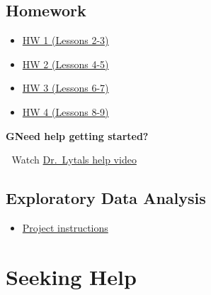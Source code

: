 \documentclass[
  letterpaper,
  DIV=11,
  numbers=noendperiod,
  oneside]{scrreprt}
\providecommand{\tightlist}{%
  \setlength{\itemsep}{0pt}\setlength{\parskip}{0pt}}\usepackage{longtable,booktabs,array}
\begin{document}
\section*{Homework}\label{homework}


\begin{itemize}
\tightlist
\item
  \href{hw/hw1.qmd}{HW 1 (Lessons 2-3)}
\item
  \href{hw/hw2.qmd}{HW 2 (Lessons 4-5)}
\item
  \href{hw/hw3.qmd}{HW 3 (Lessons 6-7)}
\item
  \href{hw/hw4.qmd}{HW 4 (Lessons 8-9)}
\end{itemize}

\begin{tcolorbox}[enhanced jigsaw, rightrule=.15mm, arc=.35mm, bottomrule=.15mm, leftrule=.75mm, breakable, colframe=quarto-callout-warning-color-frame, left=2mm, toprule=.15mm, opacityback=0, colback=white]

\vspace{-3mm}\textbf{GNeed help getting started?}\vspace{3mm}

🚧 Watch
\href{https://media.csuchico.edu/media/MATH130\%20-\%20Extra\%20Video\%20(Jan\%2029)/1_9nsoxdy9}{Dr.~Lytals
help video}

\end{tcolorbox}

\section*{Exploratory Data Analysis}\label{exploratory-data-analysis}


\begin{itemize}
\tightlist
\item
  \href{project.qmd}{Project instructions}
\end{itemize}

\chapter*{Seeking Help}\label{seeking-help}

\end{document}
